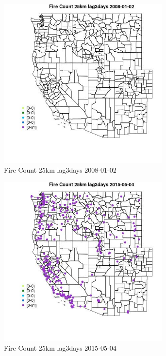 \begin{figure} 
\centering  
\includegraphics[width=0.77\textwidth]{Code_Outputs/Report_ML_input_PM25_Step4_part_e_de_duplicated_aves_compiled_2019-05-18wNAs_MapObsFire_Count_25km_lag3days2008-01-02.jpg} 
\caption{\label{fig:Report_ML_input_PM25_Step4_part_e_de_duplicated_aves_compiled_2019-05-18wNAsMapObsFire_Count_25km_lag3days2008-01-02}Fire Count 25km lag3days 2008-01-02} 
\end{figure} 
 

\begin{figure} 
\centering  
\includegraphics[width=0.77\textwidth]{Code_Outputs/Report_ML_input_PM25_Step4_part_e_de_duplicated_aves_compiled_2019-05-18wNAs_MapObsFire_Count_25km_lag3days2015-05-04.jpg} 
\caption{\label{fig:Report_ML_input_PM25_Step4_part_e_de_duplicated_aves_compiled_2019-05-18wNAsMapObsFire_Count_25km_lag3days2015-05-04}Fire Count 25km lag3days 2015-05-04} 
\end{figure} 
 

